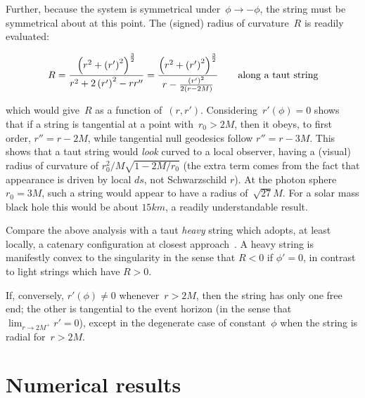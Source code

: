 \documentclass[review]{elsarticle}
\begin{document}
Further, because the system is symmetrical
under~$\phi\longrightarrow-\phi$, the string must be symmetrical about
at this point.  The (signed) radius of curvature~$R$ is readily
evaluated:


\begin{equation}\label{roc}
  R = \frac{
    \left(r^2 + \left(r'\right)^2\right)^\frac{3}{2}
  }{
    r^2 + 2\left(r'\right)^2-rr''
  }
  =
  \frac{
    \left(r^2 + \left(r'\right)^2\right)^\frac{3}{2}
  }{
    r-\frac{\left(r'\right)^2}{2\left(r-2M\right)}
  }\qquad\mbox{along a taut string}
\end{equation}

\noindent which would give~$R$ as a function of~$\left(r,r'\right)$.
Considering~$r'(\phi)=0$ shows that if a string is tangential at a
point with~$r_0>2M$, then it obeys, to first order, $r''=r-2M$, while
tangential null geodesics follow $r''=r-3M$.  This shows that a taut
string would {\em look} curved to a local observer, having a (visual)
radius of curvature of $r_0^2/M\sqrt{1-2M/r_0}$ (the extra term comes
from the fact that appearance is driven by local $ds$, not
Schwarzschild $r$).  At the photon sphere $r_0=3M$, such a string
would appear to have a radius of~$\sqrt{27}M$.  For a solar mass black
hole this would be about $15\unit{km}$, a readily understandable
result.

Compare the above analysis with a taut {\em heavy} string which
adopts, at least locally, a catenary configuration at closest
approach~\cite{nguyen2007}.  A heavy string is manifestly convex to
the singularity in the sense that $R<0$ if $\phi'=0$, in contrast to
light strings which have $R>0$.

If, conversely, $r'(\phi)\neq 0$ whenever~$r>2M$, then the string has
only one free end; the other is tangential to the event horizon (in
the sense that ${\displaystyle \lim_{r\longrightarrow 2M^+}r'=0}$),
except in the degenerate case of constant~$\phi$ when the string is
radial for~$r>2M$.

\section{Numerical results}
\end{document}
